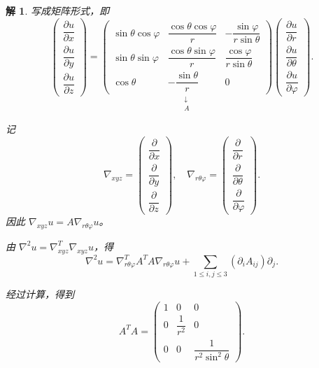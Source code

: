 \documentclass[a4paper,12pt]{article}
\newtheorem*{sol}{解}
\begin{document}
\begin{sol}
    写成矩阵形式，即
    $$
        \begin{pmatrix}
            \dfrac{\partial u}{\partial x} \\[8pt]
            \dfrac{\partial u}{\partial y} \\[8pt]
            \dfrac{\partial u}{\partial z}
        \end{pmatrix} = \underset{\substack{\downarrow\\A}}{
            \begin{pmatrix}
                \sin\theta\cos\varphi & \dfrac{\cos\theta\cos\varphi}{r} & -\dfrac{\sin\varphi}{r\sin\theta} \\[8pt]
                \sin\theta\sin\varphi & \dfrac{\cos\theta\sin\varphi}{r} & \dfrac{\cos\varphi}{r\sin\theta} \\[8pt]
                \cos\theta & -\dfrac{\sin\theta}{r} & 0
            \end{pmatrix}
        } \begin{pmatrix}
            \dfrac{\partial u}{\partial r} \\[8pt]
            \dfrac{\partial u}{\partial \theta} \\[8pt]
            \dfrac{\partial u}{\partial \varphi}
        \end{pmatrix}.
    $$
    
    记
    $$
        \nabla_{xyz} = \begin{pmatrix}
            \dfrac{\partial}{\partial x} \\[6pt]
            \dfrac{\partial}{\partial y} \\[6pt]
            \dfrac{\partial}{\partial z}
        \end{pmatrix}, \quad 
        \nabla_{r\theta\varphi} = \begin{pmatrix}
            \dfrac{\partial}{\partial r} \\[6pt]
            \dfrac{\partial}{\partial \theta} \\[6pt]
            \dfrac{\partial}{\partial \varphi}
        \end{pmatrix}.
    $$
    因此 $\nabla_{xyz}u = A\nabla_{r\theta\varphi}u$。
    
    由 $\nabla^2u = \nabla_{xyz}^T\nabla_{xyz}u$，得
    $$
        \nabla^2u = \nabla_{r\theta\varphi}^T A^T A \nabla_{r\theta\varphi}u + \sum_{1\leq i,j\leq 3} (\partial_i A_{ij}) \partial_j.
    $$
    
    经过计算，得到
    $$
        A^T A = \begin{pmatrix}
            1 & 0 & 0 \\
            0 & \dfrac{1}{r^2} & 0 \\
            0 & 0 & \dfrac{1}{r^2\sin^2\theta}
        \end{pmatrix}.
    $$
    

\end{sol}
\end{document}
